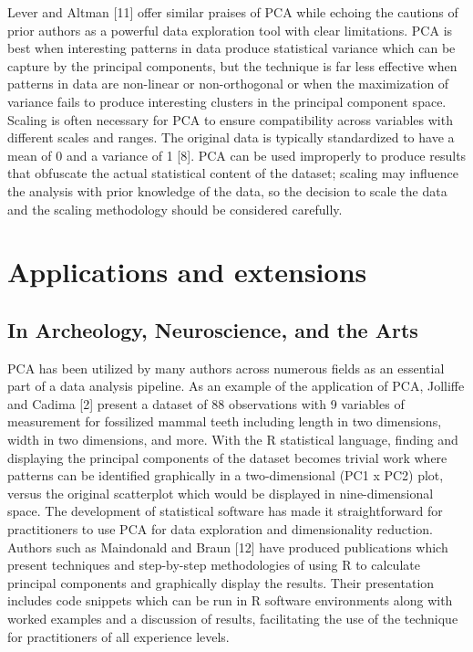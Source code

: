 \documentclass[
  letterpaper,
  DIV=11,
  numbers=noendperiod]{scrreprt}
\begin{document}
Lever and Altman {[}11{]} offer similar praises of PCA while echoing the
cautions of prior authors as a powerful data exploration tool with clear
limitations. PCA is best when interesting patterns in data produce
statistical variance which can be capture by the principal components,
but the technique is far less effective when patterns in data are
non-linear or non-orthogonal or when the maximization of variance fails
to produce interesting clusters in the principal component space.
Scaling is often necessary for PCA to ensure compatibility across
variables with different scales and ranges. The original data is
typically standardized to have a mean of 0 and a variance of 1 {[}8{]}.
PCA can be used improperly to produce results that obfuscate the actual
statistical content of the dataset; scaling may influence the analysis
with prior knowledge of the data, so the decision to scale the data and
the scaling methodology should be considered carefully.

\hypertarget{applications-and-extensions}{%
\section{Applications and
extensions}\label{applications-and-extensions}}

\hypertarget{in-archeology-neuroscience-and-the-arts}{%
\subsection{In Archeology, Neuroscience, and the
Arts}\label{in-archeology-neuroscience-and-the-arts}}

PCA has been utilized by many authors across numerous fields as an
essential part of a data analysis pipeline. As an example of the
application of PCA, Jolliffe and Cadima {[}2{]} present a dataset of 88
observations with 9 variables of measurement for fossilized mammal teeth
including length in two dimensions, width in two dimensions, and more.
With the R statistical language, finding and displaying the principal
components of the dataset becomes trivial work where patterns can be
identified graphically in a two-dimensional (PC1 x PC2) plot, versus the
original scatterplot which would be displayed in nine-dimensional space.
The development of statistical software has made it straightforward for
practitioners to use PCA for data exploration and dimensionality
reduction. Authors such as Maindonald and Braun {[}12{]} have produced
publications which present techniques and step-by-step methodologies of
using R to calculate principal components and graphically display the
results. Their presentation includes code snippets which can be run in R
software environments along with worked examples and a discussion of
results, facilitating the use of the technique for practitioners of all
experience levels.
\end{document}
